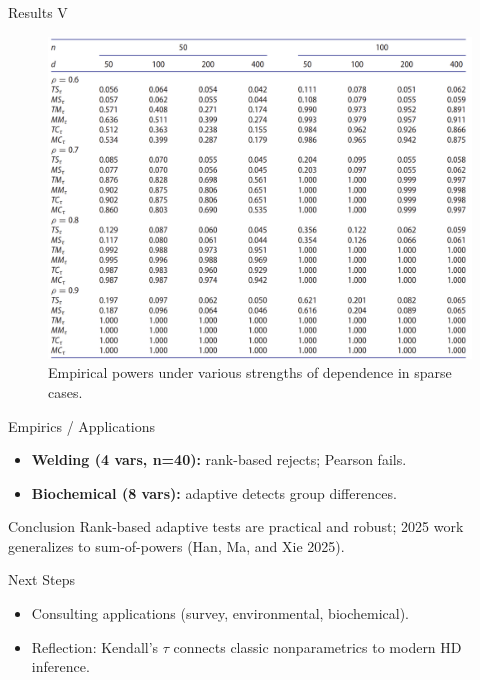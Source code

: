 \documentclass[
  ignorenonframetext,
]{beamer}
\providecommand{\tightlist}{%
  \setlength{\itemsep}{0pt}\setlength{\parskip}{0pt}}
\begin{document}
\begin{frame}{Results V}
\label{results-v}
\begin{figure}

{\centering \includegraphics[width=0.8\linewidth]{Figures/Table5} 

}

\caption{Empirical powers under various strengths of dependence in sparse cases.}\label{fig:Table 5}
\end{figure}

\begin{block}{Empirics / Applications}
\label{empirics-applications}
\begin{itemize}
\tightlist
\item
  \textbf{Welding (4 vars, n=40):} rank-based rejects; Pearson fails.
\item
  \textbf{Biochemical (8 vars):} adaptive detects group differences.
\end{itemize}
\end{block}
\end{frame}

\begin{frame}{Conclusion}
\label{conclusion}
Rank-based adaptive tests are practical and robust; 2025 work
generalizes to sum-of-powers (Han, Ma, and Xie 2025).
\end{frame}

\begin{frame}{Next Steps}
\label{next-steps}
\begin{itemize}
\tightlist
\item
  Consulting applications (survey, environmental, biochemical).
\item
  Reflection: Kendall's \(\tau\) connects classic nonparametrics to
  modern HD inference.
\end{itemize}
\end{frame}
\end{document}
